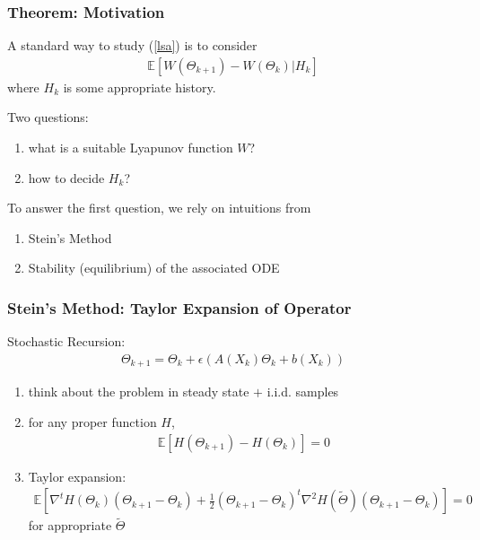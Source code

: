 \documentclass[t,10pt]{beamer}
\newcommand{\E}{\mathbb{E}}
\theoremstyle{remark}
\begin{document}



\begin{frame}
\frametitle{Theorem: Motivation}

A standard way to study (\ref{lsa}) is to consider
\begin{align}
\E[W(\Theta_{k+1})-W(\Theta_{k}) \big| H_k]
\end{align}
where $H_k$ is some appropriate history. 

Two questions:
\begin{enumerate}
\item what is a suitable Lyapunov function $W$?
\item how to decide $H_k$?
\end{enumerate}
To answer the first question, we rely on intuitions from
\begin{enumerate}
\item Stein's Method
\item Stability (equilibrium) of the associated ODE 
\end{enumerate}
\end{frame}







\begin{frame}
\frametitle{Stein's Method: Taylor Expansion of Operator}
Stochastic Recursion:
\begin{align} 
\Theta_{k+1} = \Theta_k + \epsilon(A(X_k) \Theta_k + b(X_k))
\end{align} 
\begin{enumerate}
\item think about the problem in steady state $+$ i.i.d. samples
\item for any proper function $H$, 
\begin{align}
\E[H(\Theta_{k+1})- H(\Theta_k)] = 0
\end{align}
\item Taylor expansion:
\begin{align}
\E\left[\nabla^t H(\Theta_k)(\Theta_{k+1}-\Theta_k) + \frac{1}{2}(\Theta_{k+1}-\Theta_k)^t \nabla^2 H(\tilde{\Theta})(\Theta_{k+1}-\Theta_k) \right] = 0
\end{align}
for appropriate $\tilde{\Theta}$
\end{enumerate}
\end{frame}
\end{document}
